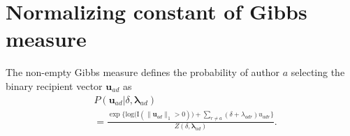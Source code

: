 \documentclass{article}
\begin{document}
\printAffiliationsAndNotice{\icmlEqualContribution} %

\section{Normalizing constant of Gibbs measure}\label{sec: non-empty Gibbs measure}
 	 The non-empty Gibbs measure \cite{fellows2017removing} defines the probability of author $a$ selecting the binary recipient vector $\boldsymbol{u}_{ad}$ as
 	 \begin{equation*} 
 	 	\begin{aligned}
 	 		& P(\boldsymbol{u}_{ad}| \delta, \boldsymbol{\lambda}_{ad} ) \\&= \frac{\exp\Big\{ \mbox{log}\big(\text{I}(\lVert \boldsymbol{u}_{ad} \rVert_1 > 0)\big) + \sum_{r \neq a} (\delta+\lambda_{adr})u_{adr} \Big\}}{Z(\delta,\boldsymbol{\lambda}_{ad})}.
 	 	\end{aligned}
 	 \end{equation*}
 	 
\end{document}
